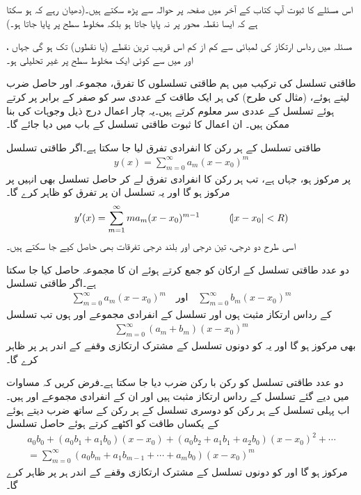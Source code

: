 اس مسئلے کا ثبوت آپ کتاب کے آخر میں صفحہ  پر حوالہ \cite{حوالہ_کریزگ_الف_گیارہ} سے پڑھ سکتے ہیں۔(دھیان رہے کہ ہو سکتا ہے کہ ایسا نقطہ  محور پر نہ پایا جاتا ہو بلکہ مخلوط سطح پر پایا جاتا ہو۔)

مسئلہ  میں  رداس ارتکاز  کی لمبائی  سے کم از کم اس قریب ترین نقطے (یا نقطوں) تک ہو گی جہاں  ،  اور   میں سے کوئی ایک مخلوط سطح پر غیر تحلیلی ہو۔

طاقتی تسلسل کی ترکیب میں ہم طاقتی تسلسلوں کا تفرق، مجموعہ اور  حاصل ضرب لیتے ہوئے، (مثال  کی طرح)  کی ہر ایک طاقت کے عددی سر کو صفر کے برابر پر کرتے ہوئے تسلسل  کے عددی سر معلوم کرتے ہیں۔یہ چار اعمال درج ذیل وجوہات کی بنا ممکن ہیں۔ ان اعمال کا ثبوت طاقتی تسلسل کے باب میں دیا جائے گا۔

\quad طاقتی تسلسل کے ہر رکن کا انفرادی تفرق لیا جا سکتا ہے۔اگر طاقتی تسلسل
\begin{align*}
y(x)=\sum_{m=0}^{\infty}a_m(x-x_0)^m
\end{align*}
  پر مرکوز ہو، جہاں  ہے، تب ہر رکن کا انفرادی تفرق لے کر حاصل تسلسل بھی انہیں  پر مرکوز ہو گا اور یہ تسلسل ان  پر  تفرق   کو ظاہر کرے گا۔ 
 \begin{align*}
y'(x)=\sum_{m=1}^{\infty} ma_m(x-x_0)^{m-1}\quad \quad \quad (\abs{x-x_0}<R)
\end{align*}
 اسی طرح دو درجی، تین درجی اور بلند درجی تفرقات بھی حاصل کیے جا سکتے ہیں۔

\quad دو عدد طاقتی تسلسل کے ارکان کو جمع کرتے ہوئے ان کا مجموعہ حاصل کیا جا سکتا ہے۔اگر طاقتی تسلسل
\begin{align}\label{مساوات_بیسل_دو_عدد_تسلسل_الف}
\sum_{m=0}^{\infty} a_m(x-x_0)^m\quad \text{اور} \quad \sum_{m=0}^{\infty} b_m(x-x_0)^m
\end{align}
کے رداس ارتکاز مثبت ہوں اور تسلسل کے انفرادی مجموعے  اور  ہوں تب تسلسل
\begin{align*}
\sum_{m=0}^{\infty} (a_m+b_m)(x-x_0)^m
\end{align*}
بھی مرکوز ہو گا اور یہ  کو  دونوں تسلسل کے مشترک ارتکازی وقفے کے اندر ہر  پر ظاہر کرے گا۔

\quad دو عدد طاقتی تسلسل کو رکن با رکن ضرب دیا جا سکتا ہے۔فرض کریں کہ مساوات  میں دیے گئے تسلسل کے رداس ارتکاز مثبت ہیں اور ان کے انفرادی مجموعے  اور  ہیں۔اب پہلی تسلسل کے ہر رکن کو دوسری تسلسل کے ہر رکن کے ساتھ ضرب دیتے ہوئے  کے یکساں طاقت کو اکٹھے کرتے ہوئے حاصل تسلسل
\begin{multline*}
a_0b_0+(a_0b_1+a_1b_0)(x-x_0)+(a_0b_2+a_1b_1+a_2b_0)(x-x_0)^2+\cdots\\
=\sum_{m=0}^{\infty} (a_0b_m+a_1b_{m-1}+\cdots+a_mb_0)(x-x_0)^m
\end{multline*}
مرکوز ہو گا اور  کو دونوں تسلسل کے مشترک ارتکازی وقفے کے اندر ہر  پر ظاہر کرے گا۔

